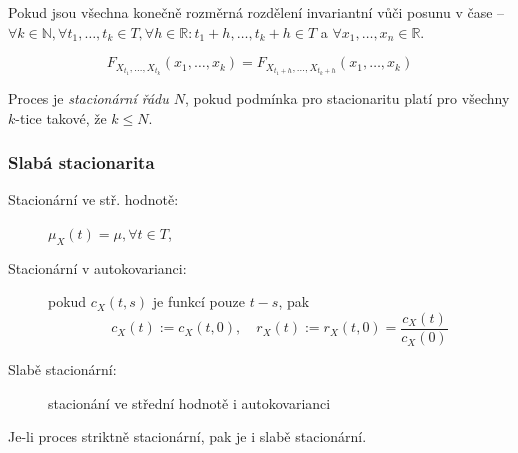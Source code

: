 Pokud jsou všechna konečně rozměrná rozdělení invariantní vůči posunu v čase -- $\forall{k \in \mathbb{N}}, \forall{t_1, \dots, t_k \in T}, \forall{h \in \mathbb{R}}: t_1+h,\dots, t_k+h \in T$ a $\forall{x_1, \dots, x_n \in \mathbb{R}}$.

$$
    F_{X_{t_1}, \dots, X_{t_k}}(x_1, \dots, x_k) = F_{X_{t_1 + h}, \dots, X_{t_k+h}}(x_1, \dots, x_k)
$$

Proces je \textit{stacionární řádu $N$}, pokud podmínka pro stacionaritu platí pro všechny $k$-tice takové, že $k \leq N$.

\subsubsection*{Slabá stacionarita}

\begin{description}
    \item[Stacionární ve stř. hodnotě:] $\mu_X(t) = \mu, \forall t \in T$,
    \item[Stacionární v autokovarianci:] pokud $c_X(t,s)$ je funkcí pouze $t-s$, pak
        $$
            c_X(t) := c_X(t, 0), \quad r_X(t) := r_X(t,0) = \frac{c_X(t)}{c_X(0)}
        $$ 
    \item[Slabě stacionární:] stacionání ve střední hodnotě i autokovarianci
\end{description}

Je-li proces striktně stacionární, pak je i slabě stacionární.
